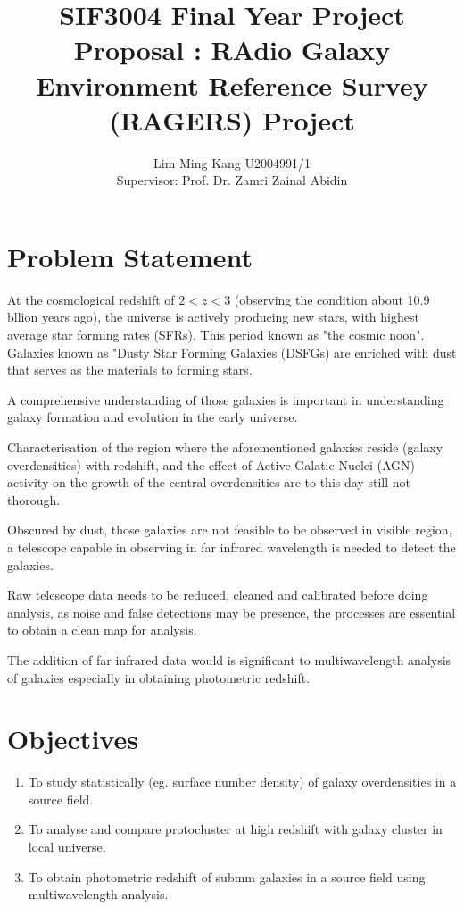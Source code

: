 \documentclass{article}
\title{SIF3004 Final Year Project Proposal : RAdio Galaxy Environment Reference Survey (RAGERS) Project }
\author{Lim Ming Kang U2004991/1\\[0.3cm]{Supervisor: Prof. Dr. Zamri Zainal Abidin}}
\begin{document}
\maketitle
\section{Problem Statement}

At the cosmological redshift of $2 < z < 3$ (observing the condition about 10.9 bllion years ago), the universe is actively producing new stars, with highest average star forming rates (SFRs). This period known as "the cosmic noon"\parencite{Schreiber2020}. Galaxies known as "Dusty Star Forming Galaxies (DSFGs) are enriched with dust that serves as the materials to forming stars.
\medskip

\noindent A comprehensive understanding of those galaxies is important in understanding galaxy formation and evolution in the early universe.\parencite{Geach2016}
\medskip

\noindent Characterisation of the region where the aforementioned galaxies reside (galaxy overdensities) with redshift, and the effect of Active Galatic Nuclei (AGN) activity on the growth of the central overdensities are to this day still not thorough.\parencite{ragers2021}
\medskip

\noindent Obscured by dust, those galaxies are not feasible to be observed in visible region, a telescope capable in observing in far infrared wavelength is needed to detect the galaxies.
\medskip

\noindent Raw telescope data needs to be reduced, cleaned and calibrated before doing analysis, as noise and false detections may be presence, the processes are essential to obtain a clean map for analysis. 

\medskip

\noindent The addition of far infrared data would is significant to multiwavelength analysis of galaxies especially in obtaining photometric redshift.

\section{Objectives}
\begin{enumerate}
    \item To study statistically (eg. surface number density) of galaxy overdensities in a source field.
    \item To analyse and compare protocluster at high redshift with galaxy cluster in local universe.
    \item To obtain photometric redshift of submm galaxies in a source field using multiwavelength analysis.
\end{enumerate}
\end{document}
